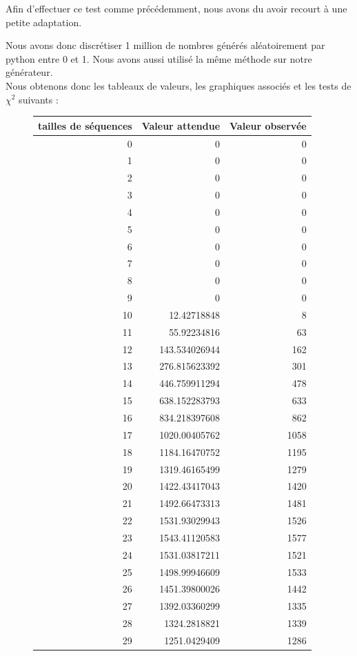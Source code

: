 \documentclass[10pt,a4paper]{article}
\begin{document}
Afin d'effectuer ce test comme précédemment, nous avons du avoir recourt à une petite adaptation. 

Nous avons donc discrétiser 1 million de nombres générés aléatoirement par python entre 0 et 1. Nous avons aussi utilisé la même méthode sur notre générateur. \\

Nous obtenons donc les tableaux de valeurs, les graphiques associés et les tests de $\chi^2$ suivants :

\begin{figure}[h]
\centering
\begin{tabular}{|r|r|r|}
\hline
tailles de séquences & Valeur attendue & Valeur observée\\
\hline
0 & 0 & 0\\
1 & 0 & 0\\
2 & 0 & 0\\
3 & 0 & 0\\
4 & 0 & 0\\
5 & 0 & 0\\
6 & 0 & 0\\
7 & 0 & 0\\
8 & 0 & 0\\
9 & 0 & 0\\
10 & 12.42718848 & 8\\
11 & 55.92234816 & 63\\
12 & 143.534026944 & 162\\
13 & 276.815623392 & 301\\
14 & 446.759911294 & 478\\
15 & 638.152283793 & 633\\
16 & 834.218397608 & 862\\
17 & 1020.00405762 & 1058\\
18 & 1184.16470752 & 1195\\
19 & 1319.46165499 & 1279\\
20 & 1422.43417043 & 1420\\
21 & 1492.66473313 & 1481\\
22 & 1531.93029943 & 1526\\
23 & 1543.41120583 & 1577\\
24 & 1531.03817211 & 1521\\
25 & 1498.99946609 & 1533\\
26 & 1451.39800026 & 1442\\
27 & 1392.03360299 & 1335\\
28 & 1324.2818821 & 1339\\
29 & 1251.0429409 & 1286\\

\end{tabular}
\end{figure}
\end{document}
